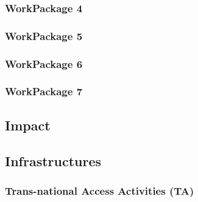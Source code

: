 \documentclass{deliverablereport}
\begin{document}
\subsubsection{WorkPackage 4}

\subsubsection{WorkPackage 5}

\subsubsection{WorkPackage 6}

\subsubsection{WorkPackage 7}


\subsection{Impact}

\subsection{Infrastructures}

\subsubsection{Trans-national Access Activities (TA)}



\end{document}
